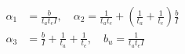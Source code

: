 $$
\begin{aligned}
\alpha_{1}&=\frac{b}{t_{a} t_{e} I},\quad \alpha_{2}=\frac{1}{t_{a} t_{e}}+\left(\frac{1}{t_{a}}+\frac{1}{t_{e}}\right) \frac{b}{I} \\
\alpha_{3}&=\frac{b}{I}+\frac{1}{t_{a}}+\frac{1}{t_{e}},\quad b_{u}=\frac{1}{t_{a} t_{e} I}
\end{aligned}
$$